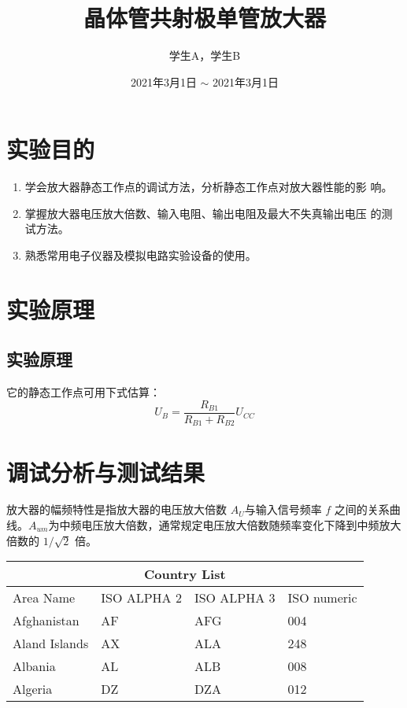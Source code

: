 \documentclass{ExpReport}
\author{学生A，学生B} %
\title{晶体管共射极单管放大器} %
\date{2021年3月1日 $\sim$ 2021年3月1日} %
\begin{document}
    \maketitle
    
    \section{实验目的}

    \begin{enumerate}
        \item 学会放大器静态工作点的调试方法，分析静态工作点对放大器性能的影
        响。
        \item 掌握放大器电压放大倍数、输入电阻、输出电阻及最大不失真输出电压
        的测试方法。
        \item 熟悉常用电子仪器及模拟电路实验设备的使用。
    \end{enumerate}

    \section{实验原理}

    \subsection{实验原理}
    它的静态工作点可用下式估算：
    $$
    U_B = \frac{R_{B1}}{R_{B1}+R_{B2}}U_{CC}
    $$

    \section{调试分析与测试结果}

    放大器的幅频特性是指放大器的电压放大倍数 $A_U$与输入信号频率 $f$ 之间的关系曲线。$A_{um}$为中频电压放大倍数，通常规定电压放大倍数随频率变化下降到中频放大倍数的 $1/\sqrt{2}$ 倍。

    \begin{table}[htbp]
        \begin{tabular}{ |p{3cm}||p{3cm}|p{3cm}|p{3cm}|  }
            \hline
            \multicolumn{4}{|c|}{Country List} \\
            \hline
            Area Name& ISO ALPHA 2 &ISO ALPHA 3&ISO numeric\\
            \hline
            Afghanistan   & AF    &AFG&   004\\
            Aland Islands&   AX  & ALA   &248\\
            Albania &AL & ALB&  008\\
            Algeria    &DZ & DZA&  012\\
            \hline
       \end{tabular}
    \end{table}
\newpage
\appendix
\end{document}
